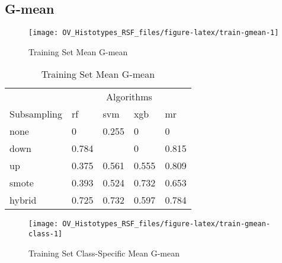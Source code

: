 \documentclass[
]{report}
\begin{document}
\hypertarget{g-mean}{%
\subsection{G-mean}\label{g-mean}}

\begin{figure}[H]

{\centering \texttt{[image: OV\_Histotypes\_RSF\_files/figure-latex/train-gmean-1]} 

}

\caption{Training Set Mean G-mean}\label{fig:train-gmean}
\end{figure}

\begin{table}

\caption{\label{tab:train-gmean-table}Training Set Mean G-mean}
\centering
\begin{tabular}[t]{l|l|l|l|l}
\hline
\multicolumn{1}{c|}{ } & \multicolumn{4}{c}{Algorithms} \\
\cline{2-5}
Subsampling & rf & svm & xgb & mr\\
\hline
none & 0 & 0.255 & 0 & 0\\
\hline
down & 0.784 & \cellcolor[HTML]{90ee90}{0.831} & 0 & 0.815\\
\hline
up & 0.375 & 0.561 & 0.555 & 0.809\\
\hline
smote & 0.393 & 0.524 & 0.732 & 0.653\\
\hline
hybrid & 0.725 & 0.732 & 0.597 & 0.784\\
\hline
\end{tabular}
\end{table}

\begin{figure}[H]

{\centering \texttt{[image: OV\_Histotypes\_RSF\_files/figure-latex/train-gmean-class-1]} 

}

\caption{Training Set Class-Specific Mean G-mean}\label{fig:train-gmean-class}
\end{figure}
\end{document}
